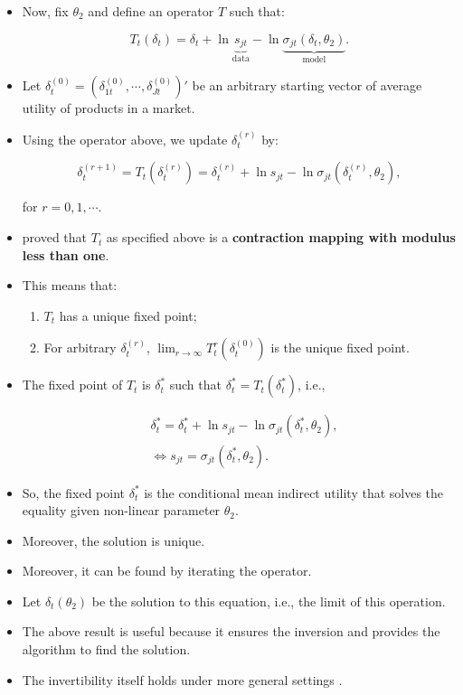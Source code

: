 \documentclass[]{book}
\providecommand{\tightlist}{%
  \setlength{\itemsep}{0pt}\setlength{\parskip}{0pt}}
\begin{document}
\begin{itemize}
\tightlist
\item
  Now, fix \(\theta_2\) and define an operator \(T\) such that:

  \begin{equation}
  T_t(\delta_t) = \delta_t + \ln \underbrace{s_{jt}}_{\text{data}} - \ln \underbrace{\sigma_{jt}(\delta_t, \theta_2)}_{\text{model}}.
  \end{equation}
\item
  Let
  \(\delta_t^{(0)} = (\delta_{1t}^{(0)}, \cdots, \delta_{Jt}^{(0)})'\)
  be an arbitrary starting vector of average utility of products in a
  market.
\item
  Using the operator above, we update \(\delta_{t}^{(r)}\) by:

  \begin{equation}
  \delta_{t}^{(r + 1)} = T_t(\delta_{t}^{(r)}) = \delta_t^{(r)} + \ln s_{jt} - \ln \sigma_{jt}(\delta_t^{(r)}, \theta_2),
  \end{equation}

  for \(r = 0, 1, \cdots\).
\item
  \citet{Berry1995a} proved that \(T_t\) as specified above is a
  \textbf{contraction mapping with modulus less than one}.
\item
  This means that:

  \begin{enumerate}
  \def\labelenumi{\arabic{enumi}.}
  \tightlist
  \item
    \(T_t\) has a unique fixed point;
  \item
    For arbitrary \(\delta_t^{(r)}\),
    \(\lim_{r \to \infty} T_t^r(\delta_t^{(0)})\) is the unique fixed
    point.
  \end{enumerate}
\item
  The fixed point of \(T_t\) is \(\delta_t^*\) such that
  \(\delta_t^* = T_t(\delta_t^*)\), i.e.,

  \begin{equation}
  \begin{split}
  &\delta_t^* = \delta_t^* + \ln s_{jt} - \ln \sigma_{jt}(\delta_t^*, \theta_2),\\
  &\Leftrightarrow s_{jt} = \sigma_{jt}(\delta_t^*, \theta_2).
  \end{split}
  \end{equation}
\item
  So, the fixed point \(\delta_t^*\) is the conditional mean indirect
  utility that solves the equality given non-linear parameter
  \(\theta_2\).
\item
  Moreover, the solution is unique.
\item
  Moreover, it can be found by iterating the operator.
\item
  Let \(\delta_t(\theta_2)\) be the solution to this equation, i.e., the
  limit of this operation.
\item
  The above result is useful because it ensures the inversion and
  provides the algorithm to find the solution.
\item
  The invertibility itself holds under more general settings
  \citep{Berry2013}.
\end{itemize}
\end{document}

